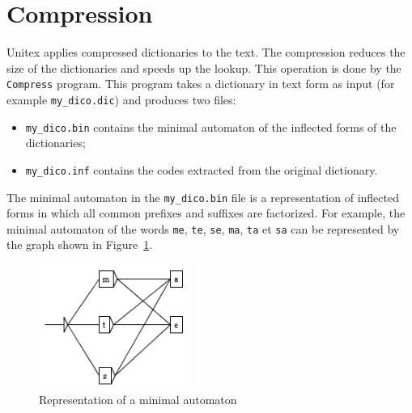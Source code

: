 \section{Compression}

Unitex applies compressed dictionaries to the text. The compression reduces the
size of the dictionaries and speeds up the lookup. This operation is done by the
\verb+Compress+ program. This program takes a dictionary in text form 
as input (for example \verb+my_dico.dic+) and produces two files:

\begin{itemize}
  \item \verb+my_dico.bin+ contains the minimal automaton of the inflected forms of the dictionaries;
  \item \verb+my_dico.inf+ contains the codes extracted from the original dictionary.
\end{itemize}

\noindent The minimal automaton in the \verb+my_dico.bin+ file is a
representation of inflected forms in which all common prefixes and suffixes are factorized. For
example, the minimal automaton of the words \verb+me+, \verb+te+, \verb+se+,
\verb+ma+, \verb+ta+ et \verb+sa+ can be represented by the graph shown in
Figure~\ref{fig-example-minimal-automaton}. \bigskip \begin{figure}[!h]
\begin{center}
\includegraphics[width=5cm]{resources/img/fig3-8.png}
\caption{Representation of a minimal
automaton\label{fig-example-minimal-automaton}}
\end{center}
\end{figure}

